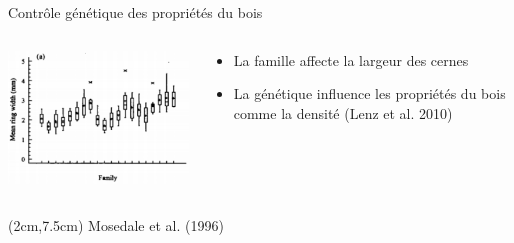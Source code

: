 \documentclass{beamer}
\begin{document}
\begin{frame}{Contrôle génétique des propriétés du bois}
	
	\begin{columns}
		
		\begin{column}{0.5\textwidth}
			\includegraphics[width=\textwidth]{controlgeneMosedale1996}
		\end{column}
		
		\begin{column}{0.5\textwidth}
			\begin{itemize} 
				\item La famille affecte la largeur des cernes\\
				\vspace{0.5cm}
				\item La génétique influence les propriétés du bois comme la densité (Lenz et al. 2010)\\
			\end{itemize}	
		\end{column}
		
	\end{columns}
		
	\begin{textblock*}{10cm}(2cm,7.5cm)
		\tiny Mosedale et al. (1996)
	\end{textblock*}
\end{frame}
\end{document}
